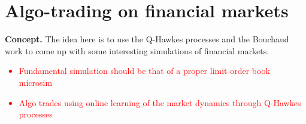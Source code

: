 \chapter{\sffamily Algo-trading on financial markets}

{\bfseries\sffamily Concept.} The idea here is to use the Q-Hawkes processes and the Bouchaud work to come up with some interesting simulations of financial markets. 

\textcolor{red}{
\begin{itemize}
\item{Fundamental simulation should be that of a proper limit order book microsim~\cite{bouchaud2018trades}}
\item{Algo trades using online learning of the market dynamics through Q-Hawkes processes} 
\end{itemize}
}

